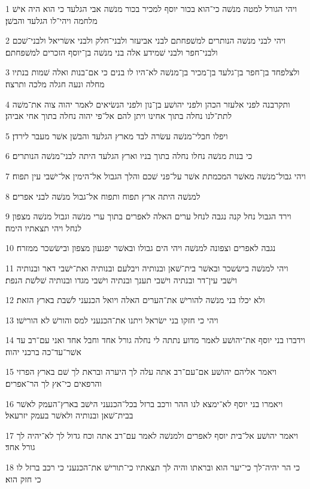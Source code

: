 \par 1 ויהי הגורל למטה מנשׁה כי־הוא בכור יוסף למכיר בכור מנשׁה אבי הגלעד כי הוא היה אישׁ מלחמה ויהי־לו הגלעד והבשׁן׃
\par 2 ויהי לבני מנשׁה הנותרים למשׁפחתם לבני אביעזר ולבני־חלק ולבני אשׂריאל ולבני־שׁכם ולבני־חפר ולבני שׁמידע אלה בני מנשׁה בן־יוסף הזכרים למשׁפחתם׃
\par 3 ולצלפחד בן־חפר בן־גלעד בן־מכיר בן־מנשׁה לא־היו לו בנים כי אם־בנות ואלה שׁמות בנתיו מחלה ונעה חגלה מלכה ותרצה׃
\par 4 ותקרבנה לפני אלעזר הכהן ולפני יהושׁע בן־נון ולפני הנשׂיאים לאמר יהוה צוה את־משׁה לתת־לנו נחלה בתוך אחינו ויתן להם אל־פי יהוה נחלה בתוך אחי אביהן׃
\par 5 ויפלו חבלי־מנשׁה עשׂרה לבד מארץ הגלעד והבשׁן אשׁר מעבר לירדן׃
\par 6 כי בנות מנשׁה נחלו נחלה בתוך בניו וארץ הגלעד היתה לבני־מנשׁה הנותרים׃
\par 7 ויהי גבול־מנשׁה מאשׁר המכמתת אשׁר על־פני שׁכם והלך הגבול אל־הימין אל־ישׁבי עין תפוח׃
\par 8 למנשׁה היתה ארץ תפוח ותפוח אל־גבול מנשׁה לבני אפרים׃
\par 9 וירד הגבול נחל קנה נגבה לנחל ערים האלה לאפרים בתוך ערי מנשׁה וגבול מנשׁה מצפון לנחל ויהי תצאתיו הימה׃
\par 10 נגבה לאפרים וצפונה למנשׁה ויהי הים גבולו ובאשׁר יפגעון מצפון ובישׂשכר ממזרח׃
\par 11 ויהי למנשׁה בישׂשכר ובאשׁר בית־שׁאן ובנותיה ויבלעם ובנותיה ואת־ישׁבי דאר ובנותיה וישׁבי עין־דר ובנתיה וישׁבי תענך ובנתיה וישׁבי מגדו ובנותיה שׁלשׁת הנפת׃
\par 12 ולא יכלו בני מנשׁה להורישׁ את־הערים האלה ויואל הכנעני לשׁבת בארץ הזאת׃
\par 13 ויהי כי חזקו בני ישׂראל ויתנו את־הכנעני למס והורשׁ לא הורישׁו׃
\par 14 וידברו בני יוסף את־יהושׁע לאמר מדוע נתתה לי נחלה גורל אחד וחבל אחד ואני עם־רב עד אשׁר־עד־כה ברכני יהוה׃
\par 15 ויאמר אליהם יהושׁע אם־עם־רב אתה עלה לך היערה ובראת לך שׁם בארץ הפרזי והרפאים כי־אץ לך הר־אפרים׃
\par 16 ויאמרו בני יוסף לא־ימצא לנו ההר ורכב ברזל בכל־הכנעני הישׁב בארץ־העמק לאשׁר בבית־שׁאן ובנותיה ולאשׁר בעמק יזרעאל׃
\par 17 ויאמר יהושׁע אל־בית יוסף לאפרים ולמנשׁה לאמר עם־רב אתה וכח גדול לך לא־יהיה לך גורל אחד׃
\par 18 כי הר יהיה־לך כי־יער הוא ובראתו והיה לך תצאתיו כי־תורישׁ את־הכנעני כי רכב ברזל לו כי חזק הוא׃

